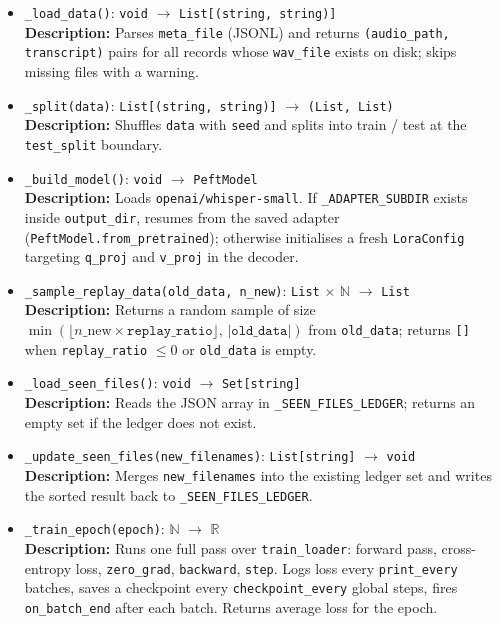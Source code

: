 \documentclass[12pt, titlepage]{article}
\begin{document}
\begin{itemize}
  \item \texttt{\_load\_data()}: \texttt{void} $\rightarrow$ \texttt{List[(string, string)]} \\
  \textbf{Description:} Parses \texttt{meta\_file} (JSONL) and returns \texttt{(audio\_path, transcript)} pairs for all records whose \texttt{wav\_file} exists on disk; skips missing files with a warning.

  \item \texttt{\_split(data)}: \texttt{List[(string, string)]} $\rightarrow$ \texttt{(List, List)} \\
  \textbf{Description:} Shuffles \texttt{data} with \texttt{seed} and splits into train / test at the \texttt{test\_split} boundary.

  \item \texttt{\_build\_model()}: \texttt{void} $\rightarrow$ \texttt{PeftModel} \\
  \textbf{Description:} Loads \texttt{openai/whisper-small}. If \texttt{\_ADAPTER\_SUBDIR} exists inside \texttt{output\_dir}, resumes from the saved adapter (\texttt{PeftModel.from\_pretrained}); otherwise initialises a fresh \texttt{LoraConfig} targeting \texttt{q\_proj} and \texttt{v\_proj} in the decoder.

  \item \texttt{\_sample\_replay\_data(old\_data, n\_new)}: \texttt{List} $\times$ $\mathbb{N}$ $\rightarrow$ \texttt{List} \\
  \textbf{Description:} Returns a random sample of size $\min(\lfloor n\_\text{new} \times \texttt{replay\_ratio} \rfloor,\, |\texttt{old\_data}|)$ from \texttt{old\_data}; returns \texttt{[]} when \texttt{replay\_ratio} $\leq 0$ or \texttt{old\_data} is empty.

  \item \texttt{\_load\_seen\_files()}: \texttt{void} $\rightarrow$ \texttt{Set[string]} \\
  \textbf{Description:} Reads the JSON array in \texttt{\_SEEN\_FILES\_LEDGER}; returns an empty set if the ledger does not exist.

  \item \texttt{\_update\_seen\_files(new\_filenames)}: \texttt{List[string]} $\rightarrow$ \texttt{void} \\
  \textbf{Description:} Merges \texttt{new\_filenames} into the existing ledger set and writes the sorted result back to \texttt{\_SEEN\_FILES\_LEDGER}.

  \item \texttt{\_train\_epoch(epoch)}: $\mathbb{N}$ $\rightarrow$ $\mathbb{R}$ \\
  \textbf{Description:} Runs one full pass over \texttt{train\_loader}: forward pass, cross-entropy loss, \texttt{zero\_grad}, \texttt{backward}, \texttt{step}. Logs loss every \texttt{print\_every} batches, saves a checkpoint every \texttt{checkpoint\_every} global steps, fires \texttt{on\_batch\_end} after each batch. Returns average loss for the epoch.


\end{itemize}
\end{document}
